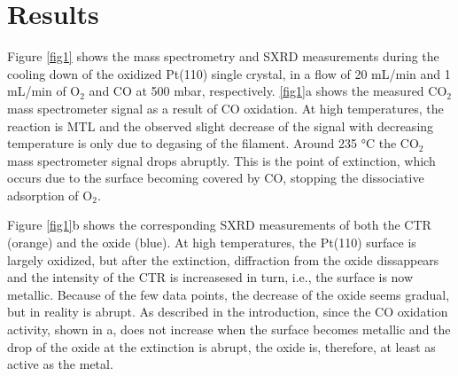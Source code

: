 \documentclass[aps,prl,groupedaddress,twocolumn]{revtex4-1}
\begin{document}





\section{Results}
Figure \ref{fig1} shows the mass spectrometry and SXRD measurements during the cooling down of the oxidized Pt(110) single crystal, in a flow of 20 mL/min and 1 mL/min of O$_2$ and CO at 500 mbar, respectively. \ref{fig1}a shows the measured CO$_2$ mass spectrometer signal as a result of CO oxidation. At high temperatures, the reaction is MTL and the observed slight decrease of the signal with decreasing temperature is only due to degasing of the filament. Around 235 $\si{\degreeCelsius}$ the CO$_2$ mass spectrometer signal drops abruptly. This is the point of extinction, which occurs due to the surface becoming covered by CO, stopping the dissociative adsorption of O$_2$. 

Figure \ref{fig1}b shows the corresponding SXRD measurements of both the CTR (orange) and the oxide (blue). At high temperatures, the Pt(110) surface is largely oxidized, but after the extinction, diffraction from the oxide dissappears and the intensity of the CTR is increasesed in turn, i.e., the surface is now metallic. Because of the few data points, the decrease of the oxide seems gradual, but in reality is abrupt. As described in the introduction, since the CO oxidation activity, shown in a, does not increase when the surface becomes metallic and the drop of the oxide at the extinction is abrupt, the oxide is, therefore, at least as active as the metal.
\end{document}
